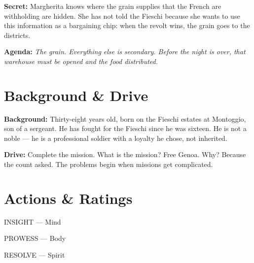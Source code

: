 \clearpage
\begin{secretbox}
\textbf{Secret:} Margherita knows where the grain supplies that the French are
withholding are hidden. She has not told the Fieschi because she wants to use this
information as a bargaining chip: when the revolt wins, the grain goes to the
districts.

\medskip\noindent\textcolor{SecretRed}{\textbf{Agenda:}} \textit{The grain. Everything
else is secondary. Before the night is over, that warehouse must be opened and the
food distributed.}
\end{secretbox}

\clearpage


\section*{Background \& Drive}
\begin{rulebox}{}
\textbf{Background:} Thirty-eight years old, born on the Fieschi estates at Montoggio,
son of a sergeant. He has fought for the Fieschi since he was sixteen. He is not a
noble --- he is a professional soldier with a loyalty he chose, not inherited.

\medskip\noindent\textcolor{FieschiGreen}{\textbf{Drive:}} Complete the mission.
What is the mission? Free Genoa. Why? Because the count asked. The problems begin
when missions get complicated.
\end{rulebox}

\section*{Actions \& Ratings}
\begin{attributoblock}[FieschiGreen]{INSIGHT --- Mind}
\end{attributoblock}
\begin{attributoblock}[FieschiGreen]{PROWESS --- Body}
\end{attributoblock}
\begin{attributoblock}[FieschiGreen]{RESOLVE --- Spirit}
\end{attributoblock}

